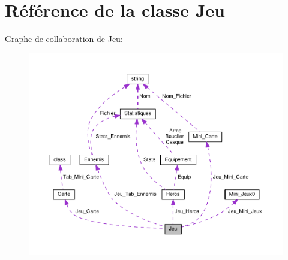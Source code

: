 \hypertarget{classJeu}{\section{Référence de la classe Jeu}
\label{classJeu}
}


Graphe de collaboration de Jeu\+:\nopagebreak
\begin{figure}[H]
\begin{center}
\leavevmode
\includegraphics[width=350pt]{classJeu__coll__graph}
\end{center}
\end{figure}
